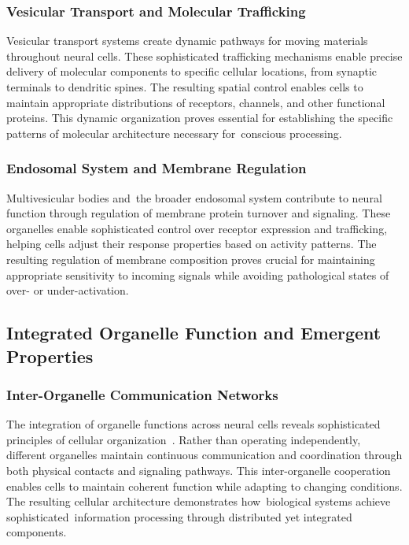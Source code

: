 \subsubsection{Vesicular Transport and Molecular Trafficking~~}

Vesicular transport systems create dynamic pathways for moving materials throughout neural cells. These sophisticated trafficking mechanisms enable precise delivery of molecular components to specific cellular locations, from synaptic terminals to dendritic spines. The resulting spatial control enables cells to maintain appropriate distributions of receptors, channels, and other functional proteins. This dynamic organization proves essential for establishing the specific patterns of molecular architecture necessary for~conscious processing.

\subsubsection{Endosomal System and Membrane Regulation~~}

Multivesicular bodies and~the broader endosomal system contribute to neural function through regulation of membrane protein turnover and signaling. These organelles enable sophisticated control over receptor expression and trafficking, helping cells adjust their response properties based on activity patterns. The resulting regulation of membrane composition proves crucial for maintaining appropriate sensitivity to incoming signals while avoiding pathological states of over- or under-activation.

\subsection*{Integrated Organelle Function and Emergent Properties~~}

\subsubsection{Inter-Organelle Communication Networks~~}

The integration of organelle functions across neural cells reveals sophisticated principles of cellular organization~\cite{Valm2017, Vance2012}. Rather than operating independently, different organelles maintain continuous communication and coordination through both physical contacts and signaling pathways. This inter-organelle cooperation enables cells to maintain coherent function while adapting to changing conditions. The resulting cellular architecture demonstrates how~biological systems achieve sophisticated~information processing through distributed yet integrated components.

